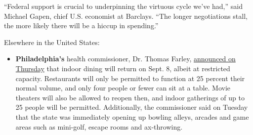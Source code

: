 ``Federal support is crucial to underpinning the virtuous cycle we've
had,'' said Michael Gapen, chief U.S. economist at Barclays. ``The
longer negotiations stall, the more likely there will be a hiccup in
spending.''

Elsewhere in the United States:

\begin{itemize}
\tightlist
\item
  \textbf{Philadelphia's} health commissioner, Dr. Thomas Farley,
  \href{https://www.phila.gov/2020-08-20-indoor-dining-is-back-on-september-8-in-philadelphia/}{announced
  on Thursday} that indoor dining will return on Sept. 8, albeit at
  restricted capacity. Restaurants will only be permitted to function at
  25 percent their normal volume, and only four people or fewer can sit
  at a table. Movie theaters will also be allowed to reopen then, and
  indoor gatherings of up to 25 people will be permitted. Additionally,
  the commissioner said on Tuesday that the state was immediately
  opening up bowling alleys, arcades and game areas such as mini-golf,
  escape rooms and ax-throwing.
\end{itemize}

